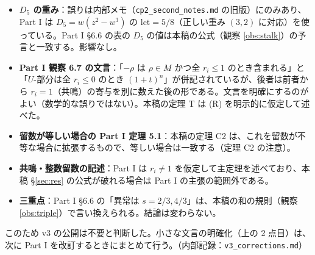 \begin{itemize}
\item \textbf{$D_5$ の重み}：誤りは内部メモ（\texttt{cp2\_second\_notes.md} の旧版）にのみあり、Part I は $D_5=w(z^2-w^3)$ の $\mathrm{lct}=5/8$（正しい重み $(3,2)$ に対応）を使っている。Part I \S6.6 の表の $D_5$ の値は本稿の公式（観察 \ref{obs:stalk}）の予言と一致する。影響なし。\tV
\item \textbf{Part I 観察 6.7 の文言}：「$-\rho$ は $\rho\in M$ かつ全 $r_i\le1$ のとき含まれる」と「$U$-部分は全 $r_i\le0$ のとき $(1+t)^n$」が併記されているが、後者は前者から $r_i=1$（共鳴）の寄与を別に数えた後の形である。文言を明確にするのがよい（数学的な誤りではない）。本稿の定理 T は (R) を明示的に仮定して述べた。
\item \textbf{留数が等しい場合の Part I 定理 5.1}：本稿の定理 C2 は、これを留数が不等な場合に拡張するもので、等しい場合は一致する（定理 C2 の注意）。
\item \textbf{共鳴・整数留数の記述}：Part I は $r_i\ne1$ を仮定して主定理を述べており、本稿 \S\ref{sec:res} の公式が破れる場合は Part I の主張の範囲外である。
\item \textbf{三重点}：Part I \S6.6 の「異常は $s=2/3,4/3$」は、本稿の和の規則（観察 \ref{obs:triple}）で言い換えられる。結論は変わらない。
\end{itemize}
このため v3 の公開は不要と判断した。小さな文言の明確化（上の 2 点目）は、次に Part I を改訂するときにまとめて行う。（内部記録：\texttt{v3\_corrections.md}）

